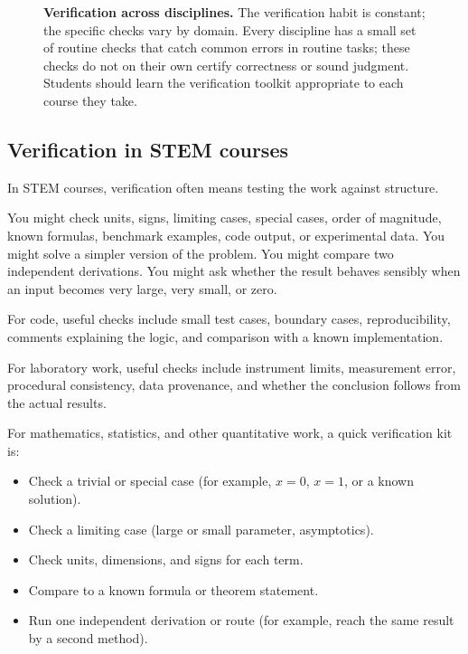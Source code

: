 \documentclass{SIAMbook2023}
\begin{document}
\begin{figure}[ht]
\caption{\textbf{Verification across disciplines.} The verification habit is constant; the specific checks vary by domain. Every discipline has a small set of routine checks that catch common errors in routine tasks; these checks do not on their own certify correctness or sound judgment. Students should learn the verification toolkit appropriate to each course they take.}
\label{fig:verification-disciplines}
\end{figure}

\subsection{Verification in STEM courses}
\label{subsec:stem-verification}%

In STEM courses, verification often means testing the work against structure.

You might check units, signs, limiting cases, special cases, order of magnitude, known formulas, benchmark examples, code output, or experimental data. You might solve a simpler version of the problem. You might compare two independent derivations. You might ask whether the result behaves sensibly when an input becomes very large, very small, or zero.

For code, useful checks include small test cases, boundary cases, reproducibility, comments explaining the logic, and comparison with a known implementation.

For laboratory work, useful checks include instrument limits, measurement error, procedural consistency, data provenance, and whether the conclusion follows from the actual results.

For mathematics, statistics, and other quantitative work, a quick verification kit is:

\begin{itemize}
\item Check a trivial or special case (for example, $x=0$, $x=1$, or a known solution).
\item Check a limiting case (large or small parameter, asymptotics).
\item Check units, dimensions, and signs for each term.
\item Compare to a known formula or theorem statement.
\item Run one independent derivation or route (for example, reach the same result by a second method).
\end{itemize}
\end{document}
